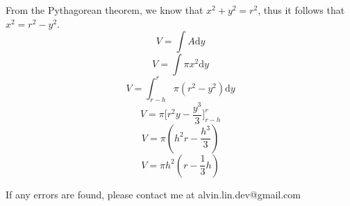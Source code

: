 \documentclass[letterpaper, 12pt]{article}
\newcommand*{\diff}{\mathrm{d}}
\begin{document}
From the Pythagorean theorem, we know that \( x^{2}+y^{2} = r^{2} \), thus it
follows that \( x^{2} = r^{2}-y^{2} \).
\[ V = \int{A\diff{y}} \]
\[ V = \int{\pi x^{2}\diff{y}} \]
\[ V = \int_{r-h}^{r}{\pi(r^{2}-y^{2})\diff{y}} \]
\[ V = \pi\bigg[r^{2}y-\frac{y^{3}}{3}\bigg]_{r-h}^{r} \]
\[ V = \pi(h^{2}r-\frac{h^{3}}{3}) \]
\[ V = \pi h^{2}(r-\frac{1}{3}h) \]

\begin{center}
  If any errors are found, please contact me at alvin.lin.dev@gmail.com
\end{center}
\end{document}
